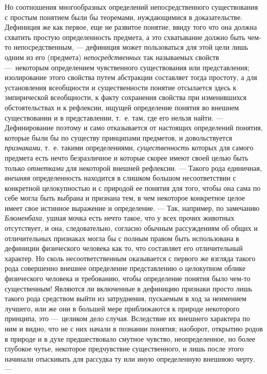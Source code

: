 \documentclass[twoside]{article}
\begin{document}
Но соотношения многообразных определений непосредственного
существования с простым понятием были бы теоремами, нуждающимися в
доказательстве. Дефиниция же как первое, еще не развитое понятие, ввиду
того что она должна схватить простую определенность предмета, а это
схватывание должно быть чем-то непосредственным, — дефиниция
может пользоваться для этой цели лишь одним из его (предмета)
{\em непосредственных}
так называемых свойств —~некоторым
определением чувственного существования или представления; изолирование
этого свойства путем абстракции составляет тогда простоту, а для
установления всеобщности и существенности понятие отсылается здесь к
эмпирической всеобщности, к факту сохранения свойства при изменившихся
обстоятельствах и к рефлексии, ищущей определение понятия во внешнем
существовании и в представлении, т.~е. там, где его нельзя найти. —
Дефинирование поэтому и само отказывается от настоящих
определений понятия, которые были бы по существу принципами предметов, и
довольствуется {\em признаками},
т.~е. такими определениями,
{\em существенность}
которых для самого предмета есть нечто безразличное и которые
скорее имеют своей целью быть только
{\em отметками} для
некоторой внешней рефлексии. — Такого рода единичная,
{\em внешняя}
определенность находится в слишком большом несоответствии с
конкретной целокупностью и с природой ее понятия для того, чтобы она сама
по себе могла быть выбрана и признана тем, в чем некоторое конкретное целое
имеет свое истинное выражение и определение. — Так,
например, по замечанию
{\em Блюменбаха}, ушная
мочка есть нечто такое, что у всех прочих животных отсутствует, и она,
следовательно, согласно обычным рассуждениям об общих и
отличительных признаках могла бы с полным правом быть
использована в дефиниции физического человека как то, что составляет его
отличительный характер. Но сколь несоответственным оказывается с первого же
взгляда такого рода совершенно внешнее определение представлению о
целокупном облике физического человека и требованию, чтобы определение
понятия было чем-то существенным! Являются ли включенные в дефиницию
признаки просто лишь такого рода средством выйти из затруднения, пускаемым
в ход за неимением лучшего, или же они в большей мере приближаются к
природе некоторого принципа, это —~целиком дело случая.
Вследствие их внешнего характера по ним и видно, что не с них начали в
познании понятия; наоборот, открытию родов в природе и в духе
предшествовало смутное чувство, неопределенное, но более глубокое чутье,
некоторое предчувствие существенного, и лишь после этого начинали
отыскивать для рассудка ту или иную определенную внешнюю черту. —
\end{document}
